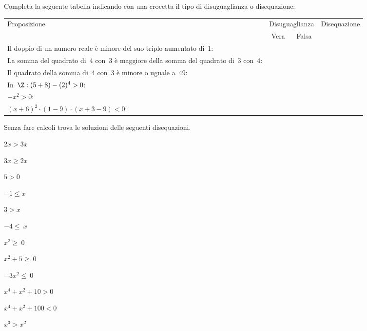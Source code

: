 \begin{esercizio}
 \label{ese:dis_9}
Completa la seguente tabella indicando con una crocetta il tipo di
disuguaglianza o disequazione:

 \begin{tabularx}{.9\textwidth}{X|c|c|c|}
 \toprule
 Proposizione&\multicolumn{2}{c}{Disuguaglianza}& Disequazione\\
  & Vera & Falsa & \\
 \midrule
 Il doppio di un numero reale è minore del suo triplo aumentato di~1: & & & \\
 \midrule
 La somma del quadrato di~4 con~3 è maggiore della somma del quadrato di~3 
con~4: & & &\\
 \midrule
 Il quadrato della somma di~4 con~3 è minore o uguale a~49: & & & \\
 \midrule
 In~\(\Z:(5+8)-(2)^{4}>0\): & & & \\
 \midrule
 \(-x^{2}>0\): & & & \\
 \midrule
 \((x+6)^{2}\cdot (1-9)\cdot (x+3-9)<0\): & & & \\
 \bottomrule
 \end{tabularx}
\end{esercizio}

\begin{esercizio}
 \label{ese:dis_10}
 Senza fare calcoli trova le soluzioni delle seguenti disequazioni.
\begin{multicols}{3}
 \begin{enumeratea}
\item \(2x>3x\)
\item \(3x\ge2x\)
\item \(5>0\)
\item \(-1\le x\)
\item \(3>x\)
\item \(-4\le~x\)
\item \(x^2\ge~0\)
\item \(x^2+5\ge~0\)
\item \(-3x^2\le~0\)
\item \(x^{4}+x^{2}+10>0\)
\item \(x^{4}+x^{2}+100<0\)
\item \(x^3>x^2\)
 \end{enumeratea}
\end{multicols}
\end{esercizio}

